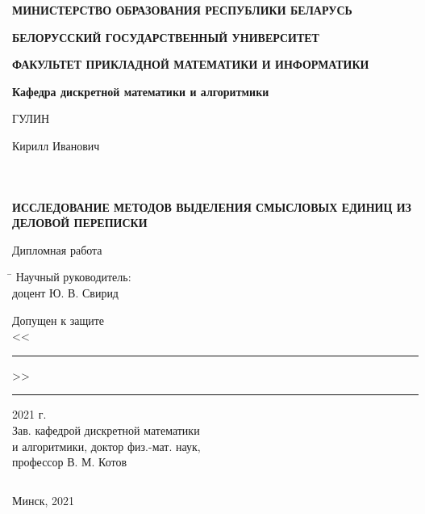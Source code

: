 \begin{titlepage}
\begin{center}

\textbf{МИНИСТЕРСТВО ОБРАЗОВАНИЯ РЕСПУБЛИКИ БЕЛАРУСЬ}
\vspace{1.5 ex}

\textbf{БЕЛОРУССКИЙ ГОСУДАРСТВЕННЫЙ УНИВЕРСИТЕТ}
\vspace{1.5 ex}

\textbf{ФАКУЛЬТЕТ ПРИКЛАДНОЙ МАТЕМАТИКИ И ИНФОРМАТИКИ}
\vspace{1.5 ex}

\textbf{Кафедра дискретной математики и алгоритмики}
\vspace{7 ex}

\noindent
ГУЛИН

\large
Кирилл Иванович
\vspace{5 ex}

$ $

$ $

$ $


\textbf{ИССЛЕДОВАНИЕ МЕТОДОВ ВЫДЕЛЕНИЯ СМЫСЛОВЫХ ЕДИНИЦ ИЗ ДЕЛОВОЙ ПЕРЕПИСКИ}

\vspace{7 ex}
\large
Дипломная работа
\vspace{5 ex}

\begin{tabbing}
\hspace*{115mm}\=\hspace*{7cm}\kill 
 \> Научный руководитель: \\
 \>  доцент Ю. В. Свирид \\ \vspace{5 ex}

Допущен к защите \\
<<\rule {30pt} {0.5 pt}>>\rule {100pt} {0.5 pt} 2021 г. \> \\
Зав. кафедрой дискретной математики \> \\
и алгоритмики, доктор физ.-мат. наук,\> \\
профессор В. М. Котов
\end{tabbing}

\vfill

$ $

Минск, 2021

\end{center}

\end{titlepage}